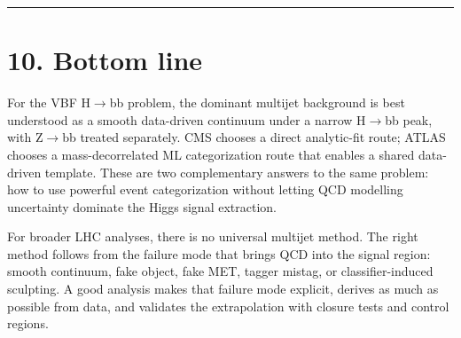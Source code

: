 \documentclass[11pt]{article}
\begin{document}
\bigskip\hrule\bigskip

\section{10. Bottom line}

For the VBF H$\to$bb problem, the dominant multijet background is best understood as a smooth data-driven continuum under a narrow H$\to$bb peak, with Z$\to$bb treated separately. CMS chooses a direct analytic-fit route; ATLAS chooses a mass-decorrelated ML categorization route that enables a shared data-driven template. These are two complementary answers to the same problem: how to use powerful event categorization without letting QCD modelling uncertainty dominate the Higgs signal extraction.

For broader LHC analyses, there is no universal multijet method. The right method follows from the failure mode that brings QCD into the signal region: smooth continuum, fake object, fake MET, tagger mistag, or classifier-induced sculpting. A good analysis makes that failure mode explicit, derives as much as possible from data, and validates the extrapolation with closure tests and control regions.
\end{document}
